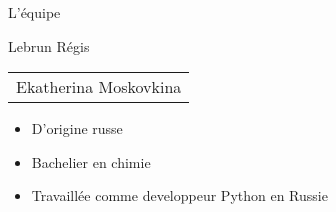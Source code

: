 \begin{frame}{L'équipe}
\begin{minipage}{0.45\textwidth}
Lebrun Régis
\end{minipage}%
\hfill
\begin{minipage}{0.45\textwidth}
\begin{tabular}{|p{\textwidth}}
Ekatherina Moskovkina
\end{tabular}
\begin{itemize}
\item D'origine russe
\item Bachelier en chimie
\item Travaillée comme developpeur Python en Russie
\end{itemize}
\end{minipage}%
\end{frame}